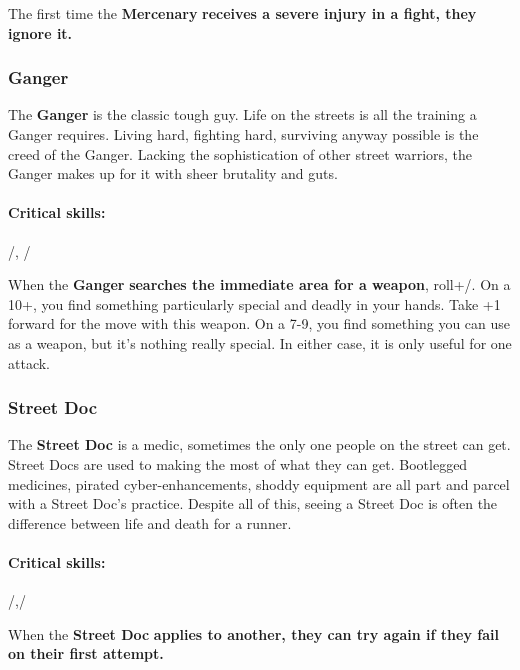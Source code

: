 \documentclass[oneside,10pt]{article}
\begin{document}
\begin{multicols}{2}
\begin{tcolorbox}[title=Special Move]
   The first time the \textbf{Mercenary}
  \textbf{receives a severe injury in a fight, they ignore it.} 
\end{tcolorbox}

\subsubsection{Ganger}

The \textbf{Ganger} is the classic tough guy. Life on the streets is
all the training a Ganger requires. Living hard, fighting hard,
surviving anyway possible is the creed of the Ganger. Lacking the
sophistication of other street warriors, the Ganger makes up for it
with sheer brutality and guts.

\paragraph{Critical skills:}
\oomph/, \flair/

\begin{tcolorbox}[title=Special Move]
   When the \textbf{Ganger}
  \textbf{searches the immediate area for a weapon}, roll+\flair/. On
  a 10+, you find something particularly special and deadly in your
  hands. Take +1 forward for the  move with
  this weapon. On a 7-9, you find something you can use as a weapon,
  but it's nothing really special. In either case, it is only useful
  for one attack.  
\end{tcolorbox}


\subsubsection{Street Doc}

The \textbf{Street Doc} is a medic, sometimes the only one people on
the street can get. Street Docs are used to making the most of what
they can get. Bootlegged medicines, pirated cyber-enhancements, shoddy
equipment are all part and parcel with a Street Doc's
practice. Despite all of this, seeing a Street Doc is often the
difference between life and death for a runner.

\paragraph{Critical skills:}
\mastery/,\twitch/

\begin{tcolorbox}[title=Special Move]
   When the \textbf{Street Doc}
  \textbf{applies  to another, they can try again
    if they fail on their first attempt.}
\end{tcolorbox}


\end{multicols}
\end{document}

